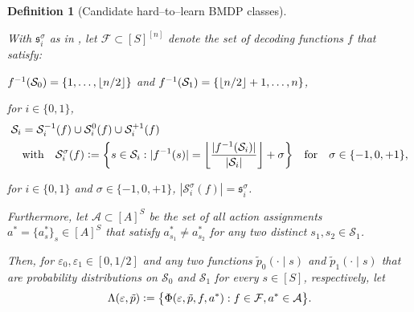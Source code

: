 \documentclass[11pt]{article}
\newcommand{\eqdef}{\vcentcolon=}
\newcommand{\mf}[1]{\mathfrak{#1}}
\newcommand{\mcA}{\mathcal{A}}
\newcommand{\mcF}{\mathcal{F}}
\newcommand{\mcS}{\mathcal{S}}
\DeclarePairedDelimiter\floor{\lfloor}{\rfloor}
\newtheorem{definition}[theorem]{Definition}
\theoremstyle{definition}
\theoremstyle{definition}
\begin{document}
\begin{definition}
	[Candidate hard--to--learn \gls{BMDP} classes]
	\label{def:hard_to_learn_class}

    With $\mf{s}^{\sigma}_i$ as in , let $\mcF\subset[S]^{[n]}$ denote the set of decoding functions $f$ that satisfy:
    \begin{definitionenum}
        \item \label{def:hard_to_learn_class:context_split}
            $f^{-1}(\mcS_0)=\{1,\ldots,\floor{n/2}\}$ and $f^{-1}(\mcS_1)=\{\floor{n/2}+1,\ldots,n\}$,

        \item \label{def:hard_to_learn_class:size_distribution_of_latent_states}
          for $i\in\{0,1\}$,
          \begin{align}
              \label{eqn:size_distribution_of_latent_states}
               &
              \mcS_i
              =
              \mcS_i^{-1}(f) \cup \mcS_i^{0}(f) \cup \mcS_i^{+1}(f)
              \\
               &
              \quad
              \mathrm{with}
              \quad
              \mcS_i^{\sigma}(f)
              \eqdef
              \biggl\{
                s\in\mcS_i
                :
                |f^{-1}(s)| = \biggl\lfloor \frac{|f^{-1}(\mcS_i)|}{|\mcS_i|} \biggr\rfloor + \sigma
              \biggr\}
              \quad
              \mathrm{for}
              \quad
              \sigma\in \{-1,0,+1\}
              ,
              \nonumber
          \end{align}
        \item \label{def:hard_to_learn_class:sizes_of_subsets}
              for $i\in\{0,1\}$ and $\sigma \in \{-1,0,+1\}$, $|\mcS_i^{\sigma}(f)|=\mf{s}^{\sigma}_i$.
    \end{definitionenum}
    Furthermore, let $\mcA \subset [A]^S$ be the set of all action assignments $a^*=\{a_s^*\}_{s}\in [A]^S$ that satisfy $a^*_{s_1}\neq a^*_{s_2}$ for any two distinct $s_1, s_2 \in \mcS_1$.

	Then, for $\varepsilon_0, \varepsilon_1 \in [0,1/2]$
	and any two functions $\tilde{p}_0(\cdot \mid s)$ and $\tilde{p}_1(\cdot \mid s)$ that are probability distributions on $\mcS_0$ and $\mcS_1$ for every $s \in [S]$, respectively,
	let
	\begin{equation}
		\Lambda( \varepsilon, \tilde{p} )
		\eqdef
		\bigl\{
		\Phi( \varepsilon, \tilde{p}, f, a^* )
		:
		f\in\mcF,
		a^* \in \mcA
		\bigr\}
		.
	\end{equation}
\end{definition}
\end{document}
